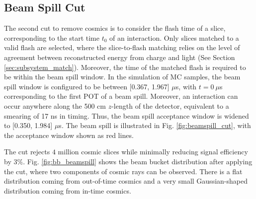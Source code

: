 \subsection{Beam Spill Cut}
\label{sec:cosmic_spill}

The second cut to remove cosmics is to consider the flash time of a slice, corresponding to the start time $t_0$ of an interaction. 
Only slices matched to a valid flash are selected, where the slice-to-flash matching relies on the level of agreement between  reconstructed energy from charge and light (See Section \ref{sec:subsystem_match}).
Moreover, the time of the matched flash is required to be within the beam spill window.
In the simulation of MC samples, the beam spill window is configured to be between [0.367, 1.967] $\mu$s, with $t = 0\ \mu$s corresponding to the first POT of a beam spill.
Moreover, an interaction can occur anywhere along the 500 cm $z$-length of the detector, equivalent to a smearing of 17 ns in timing.
Thus, the beam spill acceptance window is widened to [0.350, 1.984] $\mu$s.
The beam spill is illustrated in Fig. \ref{fig:beamspill_cut}, with the acceptance window shown as red lines.

The cut rejects $4$ million cosmic slices while minimally reducing signal efficiency by $3\%$.
Fig. \ref{fig:bb_beamspill} shows the beam bucket distribution after applying the cut, where two components of cosmic rays can be observed.
There is a flat distribution coming from out-of-time cosmics and a very small Gaussian-shaped distribution coming from in-time cosmics.

